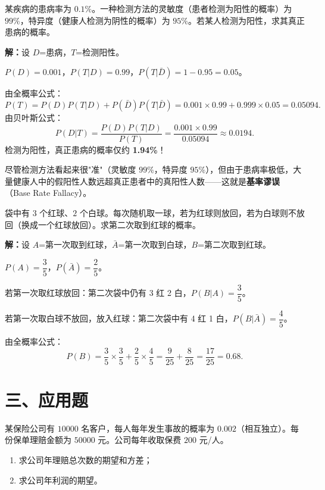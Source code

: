 \documentclass[12pt, a4paper]{ctexart}
\begin{document}
\begin{examplebox}
某疾病的患病率为 $0.1\%$。一种检测方法的灵敏度（患者检测为阳性的概率）为 $99\%$，特异度（健康人检测为阴性的概率）为 $95\%$。若某人检测为阳性，求其真正患病的概率。
\end{examplebox}

\textbf{解：}\quad 设 $D$=患病，$T$=检测阳性。\par
$P(D)=0.001$，$P(T|D)=0.99$，$P(T|\bar{D})=1-0.95=0.05$。\par
由全概率公式：
\[
P(T)=P(D)P(T|D)+P(\bar{D})P(T|\bar{D})=0.001\times0.99+0.999\times0.05=0.05094.
\]
由贝叶斯公式：
\[
P(D|T)=\frac{P(D)P(T|D)}{P(T)}=\frac{0.001\times0.99}{0.05094}\approx 0.0194.
\]
检测为阳性，真正患病的概率仅约 \textbf{1.94\%}！\par
\begin{warnbox}[直觉陷阱]
尽管检测方法看起来很"准"（灵敏度 $99\%$，特异度 $95\%$），但由于患病率极低，大量健康人中的假阳性人数远超真正患者中的真阳性人数——这就是\textbf{基率谬误}（Base Rate Fallacy）。
\end{warnbox}

\begin{examplebox}
袋中有 $3$ 个红球、$2$ 个白球。每次随机取一球，若为红球则放回，若为白球则不放回（换成一个红球放回）。求第二次取到红球的概率。
\end{examplebox}

\textbf{解：}\quad 设 $A$=第一次取到红球，$\bar{A}$=第一次取到白球，$B$=第二次取到红球。\par
$P(A)=\dfrac{3}{5}$，$P(\bar{A})=\dfrac{2}{5}$。\par
若第一次取红球放回：第二次袋中仍有 3 红 2 白，$P(B|A)=\dfrac{3}{5}$。\par
若第一次取白球不放回，放入红球：第二次袋中有 4 红 1 白，$P(B|\bar{A})=\dfrac{4}{5}$。\par
由全概率公式：
\[
P(B)=\frac{3}{5}\times\frac{3}{5}+\frac{2}{5}\times\frac{4}{5}=\frac{9}{25}+\frac{8}{25}=\frac{17}{25}=0.68.
\]

\section*{\textcolor{apppurple}{三、应用题}}

\begin{appbox}[【应用1】保险精算]
某保险公司有 $10000$ 名客户，每人每年发生事故的概率为 $0.002$（相互独立）。每份保单理赔金额为 $50000$ 元。公司每年收取保费 $200$ 元/人。
\begin{enumerate}[leftmargin=1.5em]
  \item 求公司年理赔总次数的期望和方差；
  \item 求公司年利润的期望。
\end{enumerate}
\end{appbox}
\end{document}
